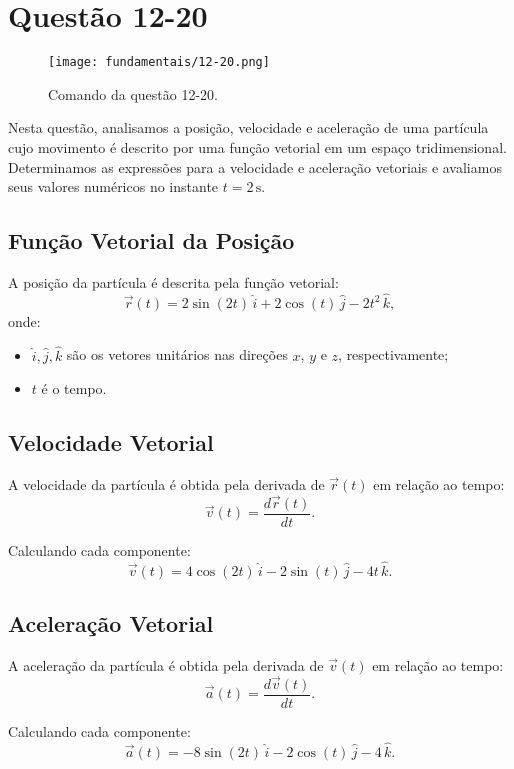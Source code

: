 \newpage
\section{Questão 12-20}

\begin{figure}[H]
	\centering
	\texttt{[image: fundamentais/12-20.png]}
	\caption{Comando da questão 12-20.}\label{fig:q12-20}
\end{figure}

Nesta questão, analisamos a posição, velocidade e aceleração de uma partícula cujo movimento é descrito por uma função vetorial em um espaço tridimensional. Determinamos as expressões para a velocidade e aceleração vetoriais e avaliamos seus valores numéricos no instante \(t = 2 \, \text{s}\).

\subsection*{Função Vetorial da Posição}
A posição da partícula é descrita pela função vetorial:
\[
\vec{r}(t) = 2 \sin(2t) \, \hat{i} + 2 \cos(t) \, \hat{j} - 2t^2 \, \hat{k},
\]
onde:
\begin{itemize}
    \item \(\hat{i}, \hat{j}, \hat{k}\) são os vetores unitários nas direções \(x\), \(y\) e \(z\), respectivamente;
    \item \(t\) é o tempo.
\end{itemize}

\subsection*{Velocidade Vetorial}
A velocidade da partícula é obtida pela derivada de \(\vec{r}(t)\) em relação ao tempo:
\[
\vec{v}(t) = \frac{d\vec{r}(t)}{dt}.
\]

Calculando cada componente:
\[
\vec{v}(t) = 4 \cos(2t) \, \hat{i} - 2 \sin(t) \, \hat{j} - 4t \, \hat{k}.
\]

\subsection*{Aceleração Vetorial}
A aceleração da partícula é obtida pela derivada de \(\vec{v}(t)\) em relação ao tempo:
\[
\vec{a}(t) = \frac{d\vec{v}(t)}{dt}.
\]

Calculando cada componente:
\[
\vec{a}(t) = -8 \sin(2t) \, \hat{i} - 2 \cos(t) \, \hat{j} - 4 \, \hat{k}.
\]

